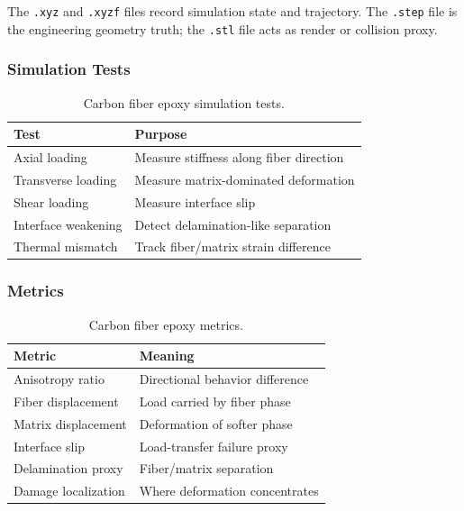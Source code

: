 \documentclass[12pt]{article}
\newcommand{\xyz}{\texttt{.xyz}}
\newcommand{\xyzf}{\texttt{.xyzf}}
\newcommand{\stepfile}{\texttt{.step}}
\newcommand{\stlfile}{\texttt{.stl}}
\begin{document}
The \xyz{} and \xyzf{} files record simulation state and trajectory.
The \stepfile{} file is the engineering geometry truth;
the \stlfile{} file acts as render or collision proxy.

\subsubsection*{Simulation Tests}

\begin{table}[H]
\centering
\caption{Carbon fiber epoxy simulation tests.}
\label{tab:cfe_tests}
\begin{tabular}{ll}
\toprule
\textbf{Test} & \textbf{Purpose} \\
\midrule
Axial loading       & Measure stiffness along fiber direction \\
Transverse loading  & Measure matrix-dominated deformation \\
Shear loading       & Measure interface slip \\
Interface weakening & Detect delamination-like separation \\
Thermal mismatch    & Track fiber/matrix strain difference \\
\bottomrule
\end{tabular}
\end{table}

\subsubsection*{Metrics}

\begin{table}[H]
\centering
\caption{Carbon fiber epoxy metrics.}
\label{tab:cfe_metrics}
\begin{tabular}{ll}
\toprule
\textbf{Metric} & \textbf{Meaning} \\
\midrule
Anisotropy ratio     & Directional behavior difference \\
Fiber displacement   & Load carried by fiber phase \\
Matrix displacement  & Deformation of softer phase \\
Interface slip       & Load-transfer failure proxy \\
Delamination proxy   & Fiber/matrix separation \\
Damage localization  & Where deformation concentrates \\
\bottomrule
\end{tabular}
\end{table}
\end{document}
